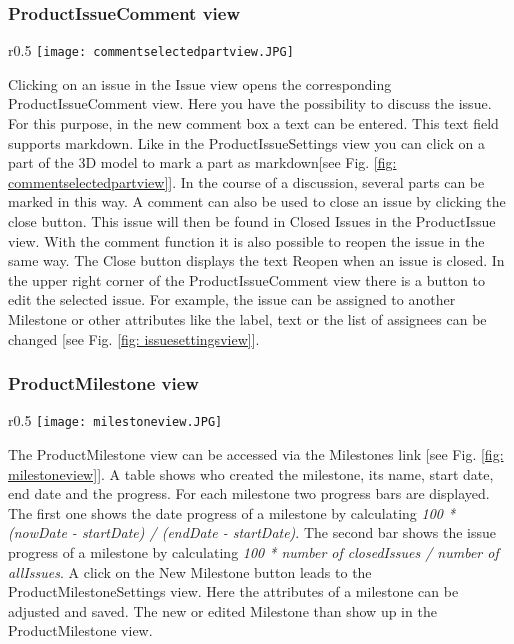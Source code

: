 \subsubsection{ProductIssueComment view}

\begin{wrapfigure}{r}{0.5\textwidth}
    \centering
    \texttt{[image: commentselectedpartview.JPG]}
    \caption{Selected part in ProductIssueComment view}
    \label{fig: commentselectedpartview}
\end{wrapfigure}

Clicking on an issue in the Issue view opens the corresponding ProductIssueComment view.  Here you have the possibility to discuss the issue. 
For this purpose, in the new comment box a text can be entered. This text field supports markdown.
Like in the ProductIssueSettings view you can click on a part of the 3D model to mark a part as markdown[see Fig. \ref{fig: commentselectedpartview}]. In the course of a discussion, several parts can be marked in this way.
A comment can also be used to close an issue by clicking the close button. This issue will then be found in Closed Issues in the ProductIssue view. With the comment function it is also possible to reopen the issue in the same way. The Close button displays the text Reopen when an issue is closed. In the upper right corner of the ProductIssueComment view there is a button to edit the selected issue. For example, the issue can be assigned to another Milestone or other attributes like the label, text or the list of assignees can be changed [see Fig. \ref{fig: issuesettingsview}].

\subsubsection{ProductMilestone view}

\begin{wrapfigure}{r}{0.5\textwidth}
    \centering
    \texttt{[image: milestoneview.JPG]}
    \caption{ProductMilestone view}
    \label{fig: milestoneview}
\end{wrapfigure}

The ProductMilestone view can be accessed via the Milestones link [see Fig. \ref{fig: milestoneview}]. A table shows who created the milestone, its name, start date, end date and the progress. For each milestone two progress bars are displayed. The first one shows the date progress of a milestone by calculating \textit{100 * (nowDate - startDate) / (endDate - startDate)}. The second bar shows the issue progress of a milestone by calculating \textit{100 * number of closedIssues / number of allIssues}.
A click on the New Milestone button leads to the ProductMilestoneSettings view. Here the attributes of a milestone can be adjusted and saved. The new or edited Milestone than show up in the ProductMilestone view.


